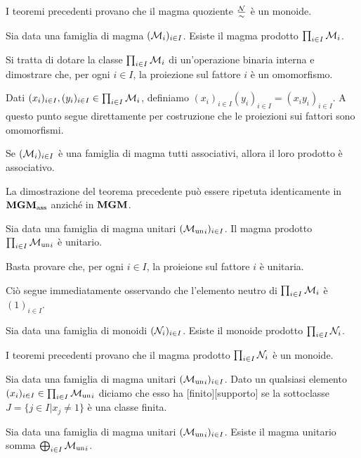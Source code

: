 \Proof I teoremi precedenti provano che il magma quoziente $\Quotient{\Monoid}{\Equivalence}$ \`e un monoide. \EndProof
\begin{Theorem}
	Sia data una famiglia di magma $(\mathcal{M}_i)_{i \in I}$. Esiste il magma prodotto $\prod_{i \in I} \mathcal{M}_i$.
\end{Theorem}
\Proof Si tratta di dotare la classe $\prod_{i \in I} \mathcal{M}_i$ di un'operazione binaria interna e dimostrare che, per ogni $i \in I$, la proiezione sul fattore $i$ \`e un omomorfismo.
\par Dati $(x_i)_{i \in I}, (y_i)_{i \in I} \in \prod_{i \in I} \mathcal{M}_i$, definiamo $(x_i)_{i \in I}(y_i)_{i \in I} = (x_iy_i)_{i \in I}$. A questo punto segue direttamente per costruzione che le proiezioni sui fattori sono omomorfismi. \EndProof
\begin{Corollary}
	Se $(\mathcal{M}_i)_{i \in I}$ \`e una famiglia di magma tutti associativi, allora il loro prodotto \`e associativo.
\end{Corollary}
\Proof La dimostrazione del teorema precedente pu\`o essere ripetuta identicamente in $\mathbf{MGM}_{\text{ass}}$ anzich\'e in $\mathbf{MGM}$. \EndProof
\begin{Theorem}
	Sia data una famiglia di magma unitari $({\mathcal{M}_{\text{un}}}_i)_{i \in I}$. Il magma prodotto $\prod_{i \in I} {\mathcal{M}_{\text{un}}}_i$ \`e unitario.
\end{Theorem}
\Proof Basta provare che, per ogni $i \in I$, la proieione sul fattore $i$ \`e unitaria.
\par Ci\`o segue immediatamente osservando che l'elemento neutro di $\prod_{i \in I} \mathcal{M}_i$ \`e $(1)_{i \in I}$. \EndProof
\begin{Corollary}
	Sia data una famiglia di monoidi $(\mathcal{N}_i)_{i \in I}$. Esiste il monoide prodotto $\prod_{i \in I} \mathcal{N}_i$.
\end{Corollary}
\Proof I teoremi precedenti provano che il magma prodotto $\prod_{i \in I} \mathcal{N}_i$ \`e un monoide. \EndProof
\begin{Definition}
	Sia data una famiglia di magma unitari $({\mathcal{M}_{\text{un}}}_i)_{i \in I}$. Dato un qualsiasi elemento $(x_i)_{i \in I} \in \prod_{i \in I} {\mathcal{M}_{\text{un}}}_i$ diciamo che esso ha [finito][supporto] se la sottoclasse $J = \lbrace j \in I | x_j \neq 1 \rbrace$ \`e una classe finita.
\end{Definition}
\begin{Theorem}
	Sia data una famiglia di magma unitari $({\mathcal{M}_{\text{un}}}_i)_{i \in I}$. Esiste il magma unitario somma $\bigoplus_{i \in I} {\mathcal{M}_{\text{un}}}_i$.
\end{Theorem}
